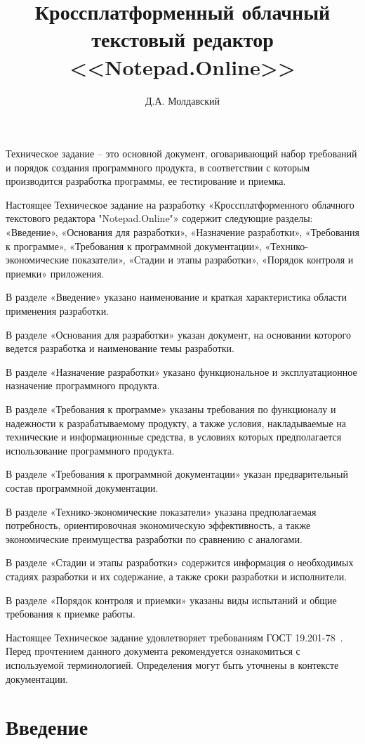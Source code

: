 ﻿\documentclass[techtask]{espd}
\author{Д.А. Молдавский}
\title{Кроссплатформенный облачный\\текстовый редактор <<Notepad.Online>>}
\begin{document}
\annotation
Техническое задание – это основной документ, оговаривающий набор требований и порядок создания программного продукта, в соответствии с которым производится разработка программы, ее тестирование и приемка.

Настоящее Техническое задание на разработку «Кроссплатформенного облачного текстового редактора "Notepad.Online"» содержит следующие разделы: «Введение», «Основания для разработки», «Назначение разработки», «Требования к программе», «Требования к программной документации», «Технико-экономические показатели», «Стадии и этапы разработки», «Порядок контроля и приемки» приложения.

В разделе «Введение» указано наименование и краткая характеристика области применения разработки.

В разделе «Основания для разработки» указан документ, на основании которого ведется разработка и наименование темы разработки.

В разделе «Назначение разработки» указано функциональное и эксплуатационное назначение программного продукта.

В разделе «Требования к программе» указаны требования по функционалу и надежности к разрабатываемому продукту, а также условия, накладываемые на технические и информационные средства, в условиях которых предполагается использование программного продукта.

В разделе «Требования к программной документации» указан предварительный состав программной документации.

В разделе «Технико-экономические показатели» указана предполагаемая потребность, ориентировочная экономическую эффективность, а также экономические преимущества разработки по сравнению с аналогами.

В разделе «Стадии и этапы разработки» содержится информация о необходимых стадиях разработки и их содержание, а также сроки разработки и исполнители.

В разделе «Порядок контроля и приемки» указаны виды испытаний и общие требования к приемке работы.

Настоящее Техническое задание удовлетворяет требованиям ГОСТ 19.201-78~\cite{espd201}. Перед прочтением данного документа рекомендуется ознакомиться с используемой терминологией. Определения могут быть уточнены в контексте документации.

\tableofcontents

\section{Введение}
\end{document}
